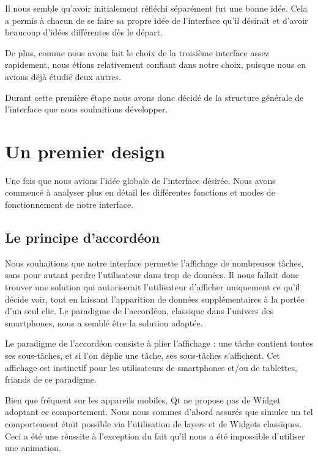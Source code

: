 \documentclass[11pt]{article}
\begin{document}
Il nous semble qu'avoir initialement réfléchi séparément fut une bonne
idée. Cela a permis à chacun de se faire sa propre idée de l'interface
qu'il désirait et d'avoir beaucoup d'idées différentes dès le départ.

De plus, comme nous avons fait le choix de la troisième interface assez
rapidement, nous étions relativement confiant dans notre choix,
puisque nous en avions déjà étudié deux autres.

Durant cette première étape nous avons donc décidé de la structure
générale de l'interface que nous souhaitions développer.


\section{Un premier design}
\label{sec:premierDesign}

Une fois que nous avions l'idée globale de l'interface désirée. Nous
avons commencé à analyser plus en détail les différentes fonctions et
modes de fonctionnement de notre interface.


\subsection{Le principe d'accordéon}

Nous souhaitions que notre interface permette l'affichage de
nombreuses tâches, sans pour autant perdre l'utilisateur dans trop de
données. Il nous fallait donc trouver une solution qui autoriserait
l'utilisateur d'afficher uniquement ce qu'il décide voir, tout en
laissant l'apparition de données supplémentaires à la portée d'un seul
clic. Le paradigme de l'accordéon, classique dans l'univers des
smartphones, nous a semblé être la solution adaptée.

Le paradigme de l'accordéon consiste à plier l'affichage : une tâche
contient toutes ses sous-tâches, et si l'on déplie une tâche, ses
sous-tâches s'affichent. Cet affichage est instinctif pour les
utilisateurs de smartphones et/ou de tablettes, friands de ce
paradigme.

Bien que fréquent sur les appareils mobiles, Qt ne propose pas de
Widget adoptant ce comportement. Nous nous sommes d'abord assurés que
simuler un tel comportement était possible via l'utilisation de layers
et de Widgets classiques. Ceci a été une réussite à l'exception du
fait qu'il nous a été impossible d'utiliser une animation.
\end{document}
